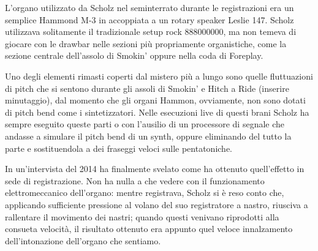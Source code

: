 \documentclass[class=book, crop=false, oneside, 12pt]{standalone}
\begin{document}
L'organo utilizzato da Scholz nel seminterrato durante le registrazioni era un semplice Hammond M-3 in accoppiata a un rotary speaker Leslie 147. Scholz utilizzava solitamente il tradizionale setup rock \(888000000\), ma non temeva di giocare con le drawbar nelle sezioni più propriamente organistiche, come la sezione centrale dell'assolo di Smokin' oppure nella coda di Foreplay.

Uno degli elementi rimasti coperti dal mistero più a lungo sono quelle fluttuazioni di pitch che si sentono durante gli assoli di Smokin' e Hitch a Ride (inserire minutaggio), dal momento che gli organi Hammon, ovviamente, non sono dotati di pitch bend come i sintetizzatori. Nelle esecuzioni live di questi brani Scholz ha sempre eseguito queste parti o con l'ausilio di un processore di segnale che andasse a simulare il pitch bend di un synth, oppure eliminando del tutto la parte e sostituendola a dei fraseggi veloci sulle pentatoniche. 

In un'intervista del 2014 ha finalmente svelato come ha ottenuto quell'effetto in sede di registrazione. Non ha nulla a che vedere con il funzionamento elettromeccanico dell'organo: mentre registrava, Scholz si è reso conto che, applicando sufficiente pressione al volano del suo registratore a nastro, riusciva a rallentare il movimento dei nastri; quando questi venivano riprodotti alla consueta velocità, il risultato ottenuto era appunto quel veloce innalzamento dell'intonazione dell'organo che sentiamo\cite{site:thirdstage_organ}. 
\end{document}
